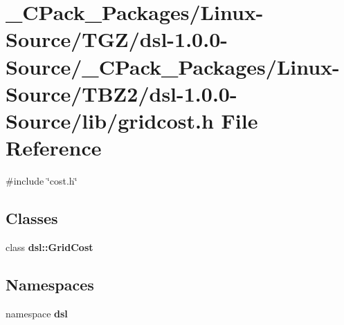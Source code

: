 \section{\_\-CPack\_\-Packages/Linux-\/Source/TGZ/dsl-\/1.0.0-\/Source/\_\-CPack\_\-Packages/Linux-\/Source/TBZ2/dsl-\/1.0.0-\/Source/lib/gridcost.h File Reference}
\label{__CPack__Packages_2Linux-Source_2TGZ_2dsl-1_80_80-Source_2__CPack__Packages_2Linux-Source_2TBZ2_bb5ee222abb6ea82cb512bed88b84101}
{\ttfamily \#include \char`\"{}cost.h\char`\"{}}\par
\subsection*{Classes}
\begin{DoxyCompactItemize}
\item 
class {\bf dsl::GridCost}
\end{DoxyCompactItemize}
\subsection*{Namespaces}
\begin{DoxyCompactItemize}
\item 
namespace {\bf dsl}
\end{DoxyCompactItemize}
